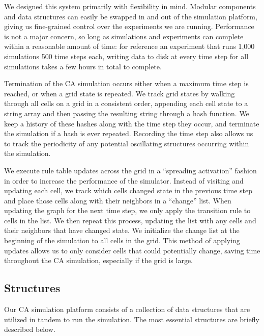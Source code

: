 \documentclass[a4paper,11pt]{report}
\begin{document}
We designed this system primarily with flexibility in mind. Modular components and data structures can easily be swapped in and out of the simulation platform, giving us fine-grained control over the experiments we are running. Performance is not a major concern, so long as simulations and experiments can complete within a reasonable amount of time: for reference an experiment that runs 1,000 simulations 500 time steps each, writing data to disk at every time step for all simulations takes a few hours in total to complete.

Termination of the CA simulation occurs either when a maximum time step is reached, or when a grid state is repeated. We track grid states by walking through all cells on a grid in a consistent order, appending each cell state to a string array and then passing the resulting string through a hash function. We keep a history of these hashes along with the time step they occur, and terminate the simulation if a hash is ever repeated. Recording the time step also allows us to track the periodicity of any potential oscillating structures occurring within the simulation.

We execute rule table updates across the grid in a ``spreading activation'' fashion in order to increase the performance of the simulator. Instead of visiting and updating each cell, we track which cells changed state in the previous time step and place those cells along with their neighbors in a ``change'' list. When updating the graph for the next time step, we only apply the transition rule to cells in the list. We then repeat this process, updating the list with any cells and their neighbors that have changed state. We initialize the change list at the beginning of the simulation to all cells in the grid. This method of applying updates allows us to only consider cells that could potentially change, saving time throughout the CA simulation, especially if the grid is large. 

\subsection{Structures}
Our CA simulation platform consists of a collection of data structures that are utilized in tandem to run the simulation. The most essential structures are briefly described below.
\end{document}
